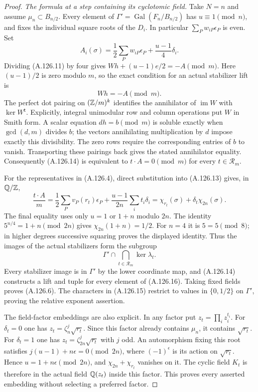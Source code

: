 \begin{proof}
\emph{The formula at a step containing its cyclotomic field.}
Take $N=n$ and assume $\mu_n\subset B_{n/2}$.
Every element of
$\Gamma'=\operatorname{Gal}(F_n/B_{n/2})$
has $u\equiv1\pmod n$, and fixes the individual
square roots of the $D_i$.
In particular $\sum_Pw_{iP}\epsilon_P$ is even.
Set
\[
             A_i(\sigma)=\frac12\sum_Pw_{iP}\epsilon_P
                              +\frac{u-1}{4}\delta_i.
\tag{A.126.13}
\]
Dividing (A.126.11) by four gives
$Wh+(u-1)e/2=-A\pmod m$.
Here $(u-1)/2$ is zero modulo $m$, so the exact
condition for an actual stabilizer lift is
\[
                             Wh=-A\pmod m.
\tag{A.126.14}
\]
The perfect dot pairing on $(\mathbb Z/m)^k$ identifies
the annihilator of $\operatorname{im}W$ with
$\ker W^{\mathsf t}$.
Explicitly, integral unimodular row and column operations
put $W$ in Smith form.  A scalar equation $dh=b\pmod m$
is soluble exactly when $\gcd(d,m)$ divides $b$;
the vectors annihilating multiplication by $d$ impose
exactly this divisibility.  The zero rows require the
corresponding entries of $b$ to vanish.  Transporting
these pairings back gives the stated annihilator equality.
Consequently (A.126.14) is equivalent to
$t\cdot A=0\pmod m$ for every $t\in\mathcal R_m$.

For the representatives in (A.126.4), direct substitution
into (A.126.13) gives, in $\mathbb Q/\mathbb Z$,
\[
 \frac{t\cdot A}{m}
   =\frac12\sum_Pv_P(r_t)\epsilon_P
       +\frac{u-1}{2n}\sum_i t_i\delta_i
   =\chi_{r_t}(\sigma)+\delta_t\chi_{2n}(\sigma).
\tag{A.126.15}
\]
The final equality uses only $u=1$ or $1+n$ modulo
$2n$.  The identity
$5^{n/4}=1+n\pmod{2n}$ gives
$\chi_{2n}(1+n)=1/2$.
For $n=4$ it is $5=5\pmod8$; in higher degrees
successive squaring proves the displayed identity.
Thus the images of the actual stabilizers form the
subgroup
\[
              \Gamma'\cap\bigcap_{t\in\mathcal R_m}
                                      \ker\lambda_t.
\tag{A.126.16}
\]
Every stabilizer image is in $\Gamma'$ by the lower
coordinate map, and (A.126.14) constructs a lift and
tuple for every element of (A.126.16).
Taking fixed fields proves (A.126.6).
The characters in (A.126.15) restrict to values in
$\{0,1/2\}$ on $\Gamma'$, proving the relative
exponent assertion.

The field-factor embeddings are also explicit.
In any factor put $z_t=\prod_i z_i^{t_i}$.
For $\delta_t=0$ one has
$z_t=\zeta_n^j\sqrt{r_t}$.
Since this factor already contains $\mu_n$, it
contains $\sqrt{r_t}$.
For $\delta_t=1$ one has
$z_t=\zeta_{2n}^j\sqrt{r_t}$ with $j$ odd.
An automorphism fixing this root satisfies
$j(u-1)+n\epsilon=0\pmod{2n}$, where
$(-1)^\epsilon$ is its action on $\sqrt{r_t}$.
Hence $u=1+n\epsilon\pmod{2n}$, and
$\chi_{2n}+\chi_{r_t}$ vanishes on it.
The cyclic field $K_t$ is therefore in the actual
field $\mathbb Q(z_t)$ inside this factor.
This proves every asserted embedding without selecting
a preferred factor.


\end{proof}
